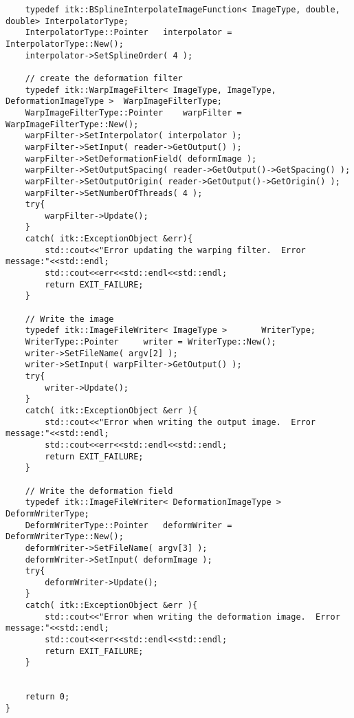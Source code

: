 \begin{lstlisting}
	typedef itk::BSplineInterpolateImageFunction< ImageType, double, double> InterpolatorType;
	InterpolatorType::Pointer	interpolator = InterpolatorType::New();
	interpolator->SetSplineOrder( 4 );
	
	// create the deformation filter
	typedef itk::WarpImageFilter< ImageType, ImageType, DeformationImageType >	WarpImageFilterType;
	WarpImageFilterType::Pointer	warpFilter = WarpImageFilterType::New();
	warpFilter->SetInterpolator( interpolator );
	warpFilter->SetInput( reader->GetOutput() );
	warpFilter->SetDeformationField( deformImage );
	warpFilter->SetOutputSpacing( reader->GetOutput()->GetSpacing() );
	warpFilter->SetOutputOrigin( reader->GetOutput()->GetOrigin() );
	warpFilter->SetNumberOfThreads( 4 );
	try{
		warpFilter->Update();
	}
	catch( itk::ExceptionObject &err){
		std::cout<<"Error updating the warping filter.  Error message:"<<std::endl;
		std::cout<<err<<std::endl<<std::endl;
		return EXIT_FAILURE;
	}
	
	// Write the image
	typedef itk::ImageFileWriter< ImageType >		WriterType;
	WriterType::Pointer		writer = WriterType::New();
	writer->SetFileName( argv[2] );
	writer->SetInput( warpFilter->GetOutput() );
	try{
		writer->Update();
	}
	catch( itk::ExceptionObject &err ){
		std::cout<<"Error when writing the output image.  Error message:"<<std::endl;
		std::cout<<err<<std::endl<<std::endl;
		return EXIT_FAILURE;
	}
	
	// Write the deformation field
	typedef itk::ImageFileWriter< DeformationImageType >	DeformWriterType;
	DeformWriterType::Pointer	deformWriter = DeformWriterType::New();
	deformWriter->SetFileName( argv[3] );
	deformWriter->SetInput( deformImage );
	try{
		deformWriter->Update();
	}
	catch( itk::ExceptionObject &err ){
		std::cout<<"Error when writing the deformation image.  Error message:"<<std::endl;
		std::cout<<err<<std::endl<<std::endl;
		return EXIT_FAILURE;
	}
	
	
	return 0;
}

\end{lstlisting}